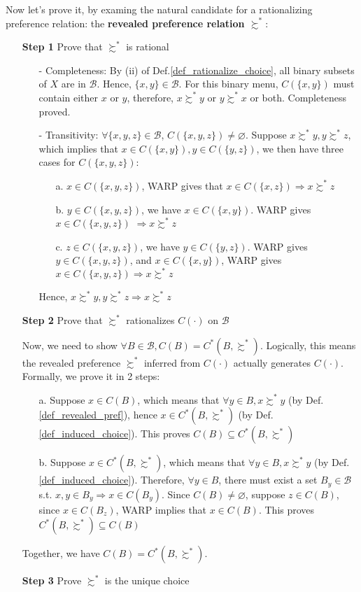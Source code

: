 Now let's prove it, by examing the natural candidate for a rationalizing preference relation: the \textbf{revealed preference relation $\succsim^*$}:
\begin{enumerate}
    \item[\textbf{Step 1}] Prove that $\succsim^*$ is rational
    \begin{enumerate}
        \item[-] Completeness: By (ii) of Def.\ref{def_rationalize_choice}, all binary subsets of $X$ are in $\mathcal{B}$. Hence, $\{x,y\}\in\mathcal{B}$. For this binary menu, $C(\{x,y\})$ must contain either $x$ or $y$, therefore, $x\succsim^*y$ or $y\succsim^* x$ or both. Completeness proved.
        \item[-] Transitivity: $\forall\{x,y,z\}\in \mathcal{B}$, $C(\{x,y,z\})\neq \varnothing$. Suppose $x\succsim^*y,y\succsim^*z$, which implies that $x\in C(\{x,y\}),y\in C(\{y,z\})$, we then have three cases for $C(\{x,y,z\})$:
        \begin{enumerate}
            \item[a.] $x\in C(\{x,y,z\})$, WARP gives that $x\in C(\{x,z\})\Rightarrow x\succsim^*z$
            \item[b.] $y\in C(\{x,y,z\})$, we have $x\in C(\{x,y\})$. WARP gives $x\in C(\{x,y,z\})$ $\Rightarrow x\succsim^* z$
            \item[c.] $z\in C(\{x,y,z\})$, we have $y\in C(\{y,z\})$. WARP gives $y\in C(\{x,y,z\})$, and $x\in C(\{x,y\})$, WARP gives $x\in C(\{x,y,z\})\Rightarrow x\succsim^*z$
        \end{enumerate} 
        Hence, $x\succsim^*y,y\succsim^*z\Rightarrow x\succsim^* z$
    \end{enumerate} 
    \item[\textbf{Step 2}] Prove that $\succsim^*$ rationalizes $C(\cdot)$ on $\mathcal{B}$
    
    Now, we need to show $\forall B\in\mathcal{B}, C(B)=C^*(B,\succsim^*)$. Logically, this means the revealed preference $\succsim^*$ inferred from $C(\cdot)$ actually generates $C(\cdot)$. Formally, we prove it in 2 steps:
    \begin{enumerate}
        \item[a.] Suppose $x\in C(B)$, which means that $\forall y\in B, x\succsim^* y$ (by Def.\ref{def_revealed_pref}), hence $x\in C^*(B,\succsim^*)$ (by Def.\ref{def_induced_choice}). This proves $C(B)\subseteq C^*(B,\succsim^*)$
        \item[b.] Suppose $x\in C^*(B,\succsim^*)$, which means that $\forall y\in B, x\succsim^* y$ (by Def.\ref{def_induced_choice}). Therefore, $\forall y\in B$, there must exist a set $B_y\in\mathcal{B}$ s.t.
         $x,y\in B_y\Rightarrow x\in C(B_y)$. Since $C(B)\neq \varnothing$, suppose $z\in C(B)$, since $x\in C(B_z)$, WARP implies that $x\in C(B)$. This proves $C^*(B,\succsim^*)\subseteq C(B)$
    \end{enumerate}
    Together, we have $C(B)=C^*(B,\succsim^*)$.
    \item[\textbf{Step 3}] Prove $\succsim^*$ is the unique choice
    

\end{enumerate}
